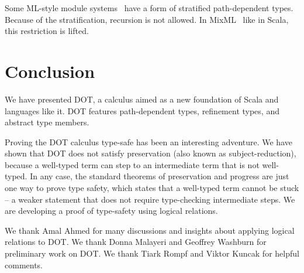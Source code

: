 \documentclass[9pt]{sigplanconf}
\begin{document}
Some ML-style module systems~\cite{homl,mixinml} have a form of
stratified path-dependent types. Because of the stratification,
recursion is not allowed. In MixML~\cite{mixml} like in Scala, this
restriction is lifted.

\section{Conclusion}\label{conclusion}

We have presented DOT, a calculus aimed as a new foundation of Scala
and languages like it. DOT features path-dependent types, refinement
types, and abstract type members.

Proving the DOT calculus type-safe has been an interesting
adventure. We have shown that DOT does not satisfy preservation (also
known as subject-reduction), because a well-typed term can step to an
intermediate term that is not well-typed. In any case, the standard
theorems of preservation and progress are just one way to prove type
safety, which states that a well-typed term cannot be stuck -- a
weaker statement that does not require type-checking intermediate
steps. We are developing a proof of type-safety using logical
relations.


\acks

We thank Amal Ahmed for many discussions and insights about applying
logical relations to DOT. We thank Donna Malayeri and Geoffrey
Washburn for preliminary work on DOT. We thank Tiark Rompf and Viktor
Kuncak for helpful comments.



\end{document}
